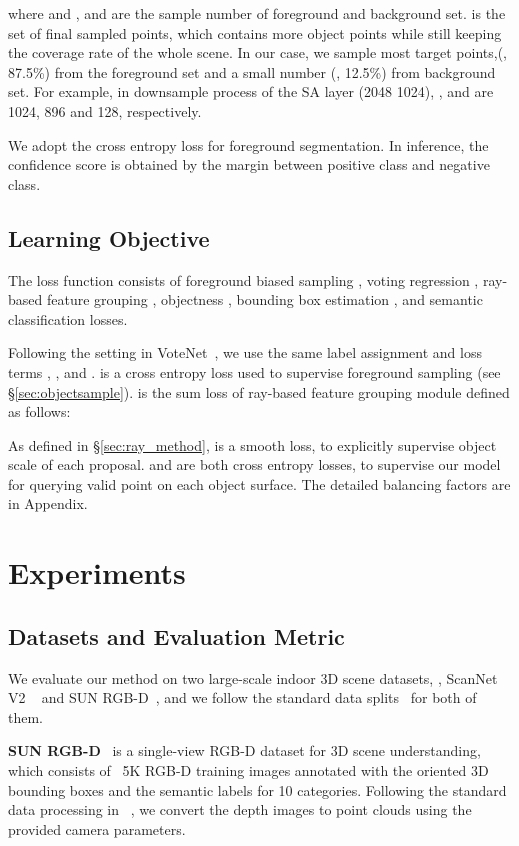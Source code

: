\documentclass[final]{cvpr}
\begin{document}
where  and ,  and  are the sample number of foreground and background set. 
 is the set of final sampled points, which contains more object points while still keeping the coverage rate of the whole scene.
In our case, we sample most target points,(\ie, 87.5\%) from the foreground set and a small number (\ie, 12.5\%) from background set. For example, in downsample process of the  SA layer (2048  1024), ,  and  are 1024, 896 and 128, respectively. 
 
We adopt the cross entropy loss for foreground segmentation. In inference, the confidence score is obtained by the margin between positive class and negative class. 

\subsection{Learning Objective}\label{sec:learn}
The loss function consists of foreground biased sampling , voting regression , ray-based feature grouping , objectness , bounding box estimation , and semantic classification  losses.
\vspace{-10pt}


Following the setting in VoteNet~\cite{qi2019deep}, we use the same label assignment and loss terms , ,  and . 
 is a cross entropy loss used to supervise foreground sampling (see \S\ref{sec:objectsample}). 
 is the sum loss of ray-based feature grouping module defined as follows:

\vspace{-10pt}

As defined in \S\ref{sec:ray_method},  is a smooth  loss, to explicitly supervise object scale of each proposal.  and  are both cross entropy losses, to supervise our model for querying valid point on each object surface. The detailed balancing factors are in Appendix.

\section{Experiments}
\subsection{Datasets and Evaluation Metric} \label{sec:data_metric}
We evaluate our method on two large-scale indoor 3D scene datasets, \ie, ScanNet V2 ~\cite{dai2017scannet} and SUN RGB-D~\cite{sunrgbd}, and we follow the standard data splits~\cite{qi2019deep} for both of them.

\noindent \textbf{SUN RGB-D}~\cite{sunrgbd} is a single-view RGB-D dataset for 3D scene understanding, which consists of ~5K RGB-D training images annotated with the oriented 3D bounding boxes and the semantic labels for 10 categories. Following the standard data processing in ~\cite{qi2019deep}, we convert the depth images to point clouds using the provided camera parameters. 
\end{document}
